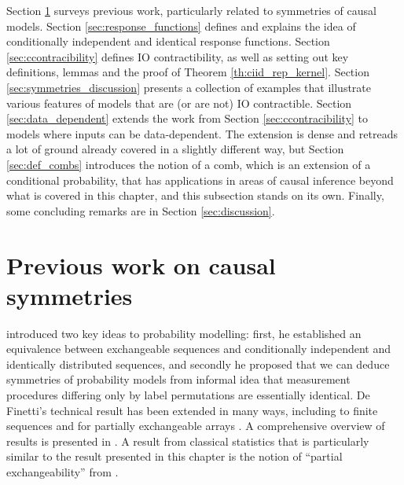 Section \ref{sec:prev_work} surveys previous work, particularly related to symmetries of causal models. Section \ref{sec:response_functions} defines and explains the idea of conditionally independent and identical response functions. Section \ref{sec:ccontracibility} defines IO contractibility, as well as setting out key definitions, lemmas and the proof of Theorem \ref{th:ciid_rep_kernel}. Section \ref{sec:symmetries_discussion} presents a collection of examples that illustrate various features of models that are (or are not) IO contractible. Section \ref{sec:data_dependent} extends the work from Section \ref{sec:ccontracibility} to models where inputs can be data-dependent. The extension is dense and retreads a lot of ground already covered in a slightly different way, but Section \ref{sec:def_combs} introduces the notion of a comb, which is an extension of a conditional probability, that has applications in areas of causal inference beyond what is covered in this chapter, and this subsection stands on its own. Finally, some concluding remarks are in Section \ref{sec:discussion}.


\section{Previous work on causal symmetries}\label{sec:prev_work}

\cite{de_finetti_foresight_1992} introduced two key ideas to probability modelling: first, he established an equivalence between exchangeable sequences and conditionally independent and identically distributed sequences, and secondly he proposed that we can deduce symmetries of probability models from informal idea that measurement procedures differing only by label permutations are essentially identical. De Finetti's technical result has been extended in many ways, including to finite sequences \citep{kerns_definettis_2006,diaconis_finite_1980} and for partially exchangeable arrays \citep{aldous_representations_1981}. A comprehensive overview of results is presented in \citet{kallenberg_probabilistic_2005}. A result from classical statistics that is particularly similar to the result presented in this chapter is the notion of ``partial exchangeability'' from \citet{diaconis_recent_1988}.

